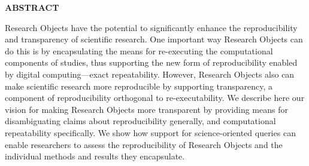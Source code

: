 
\textbf{ABSTRACT}

\noindent Research Objects have the potential to significantly enhance the reproducibility
and transparency of scientific research.  One important way Research Objects can do this
is by encapsulating the means for re-executing the computational components
of studies, thus supporting the new form of reproducibility enabled by digital 
computing---exact repeatability.  However, Research Objects also can make 
scientific research more reproducible by supporting transparency, a component
of reproducibility orthogonal to re-executability.  We describe here our vision for 
making Research Objects more transparent by providing means for disambiguating 
claims about reproducibility generally, and computational repeatability specifically.
We show how support for science-oriented queries can enable researchers to
assess the reproducibility of Research Objects and the individual methods and results
they encapsulate.

